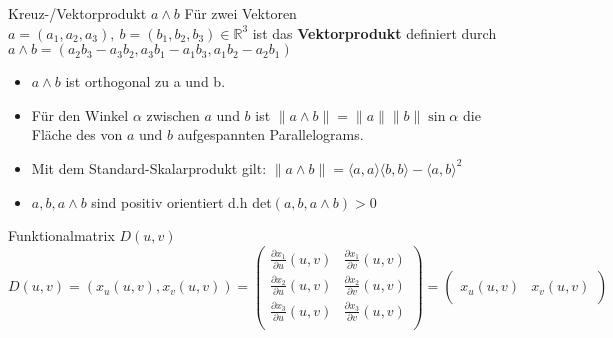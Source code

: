 \begin{titleDef}{Kreuz-/Vektorprodukt $a\wedge b$}
\label{vektorprodukt}
Für zwei Vektoren $a=(a_1,a_2,a_3),\ b=(b_1,b_2,b_3)\in\mathbb{R}^3$ ist das \textbf{Vektorprodukt} definiert durch ${a\wedge b=(a_2b_3-a_3b_2,a_3b_1-a_1b_3,a_1b_2-a_2b_1)}$
\begin{itemize}
	\item $a\wedge b$ ist orthogonal zu a und b.
	\item Für den Winkel $\alpha$ zwischen $a$ und $b$ ist $\lVert a\wedge b\rVert=\lVert a\rVert\lVert b\rVert\sin\alpha$ die Fläche des von $a$ und $b$ aufgespannten Parallelograms.
	\item Mit dem Standard-Skalarprodukt gilt: $\lVert a\wedge b\rVert = \langle a,a\rangle\langle b,b\rangle-\langle a,b\rangle^2$
	\item $a,b,a\wedge b$ sind positiv orientiert d.h det$(a,b,a\wedge b)>0$
\end{itemize} 
\end{titleDef}

\begin{titleDef}{Funktionalmatrix $D(u,v)$}
\label{funktmatrix}
$$D(u,v)=(x_u(u,v),x_v(u,v))=\begin{pmatrix}
	\frac{\partial x_1}{\partial u}(u,v)&\frac{\partial x_1}{\partial v}(u,v)\\
	\frac{\partial x_2}{\partial u}(u,v)&\frac{\partial x_2}{\partial v}(u,v)\\
	\frac{\partial x_3}{\partial u}(u,v)&\frac{\partial x_3}{\partial v}(u,v)\\
\end{pmatrix}=\begin{pmatrix}
&\\
x_u(u,v)&x_v(u,v)\\
&
\end{pmatrix}$$
\end{titleDef}

